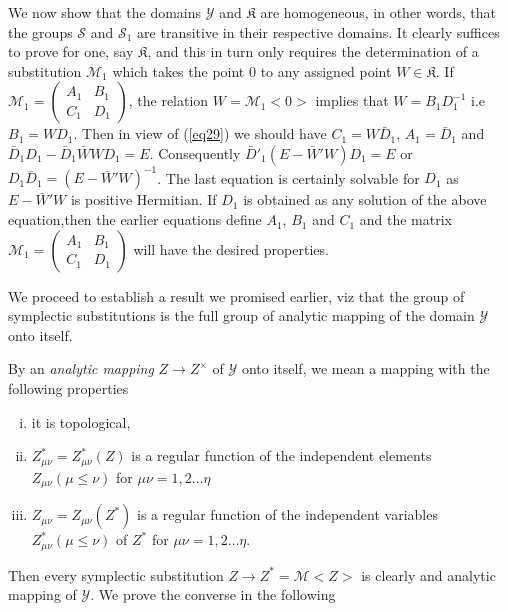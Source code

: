  We now show that the domains $\mathscr{Y}$ and $\mathfrak{K}$ are
 homogeneous, in other words, that the groups $\mathcal{S}$ and
 $\mathcal{S}_1$ are transitive in their respective domains. It
 clearly suffices to prove for one, say $\mathfrak{K}$, and this in
 turn only requires the determination of a substitution  $\mathcal{M}_1$ which
 takes the point 0 to any assigned point $W \in
 \mathfrak{K}$. If $\mathcal{M}_1 = \begin{pmatrix}  A_1 & B_1 \\ C_1 &
   D_1\end{pmatrix}$, the relation $W = \mathcal{M}_1 < 0 >$ implies that $W =
   B_1 D_1^{-1}$ i.e $B_1 = W D_1$. Then in view of (\ref{eq29}) we should have
   $C_1 = W \bar{D}_1$, $ A_1 = \bar{D}_1$ and $\bar{D}_1 D_1 - \bar{D}_1
   \bar{W} W D_1 = E$. Consequently $\bar{D}'_1 (E - \bar{W}'W) D_1 =
   E$ or $D_1 \bar{D}_1 = (E - \bar{W}' W)^{-1}$. The last
   equation is certainly solvable for $D_1$ as $E -\bar{W}'W$ is
   positive Hermitian. If $D_1$ is obtained as any solution of the
   above equation,\pageoriginale then the earlier equations define
   $A_1$, $B_1$ and    $C_1$ and the matrix $\mathcal{M}_1
   = \begin{pmatrix} A_1 & B_1\\ C_1 &      D_1\end{pmatrix}$ will
     have the desired properties.     

 We proceed to establish a result we promised earlier, viz that the
 group of symplectic substitutions is the full group of analytic
 mapping of the domain $\mathscr{Y}$ onto itself. 
 
 By an \textit{analytic mapping} $Z \to Z^\times$ of $\mathscr{Y}$
 onto itself, we mean a mapping with the following properties  
 \begin{enumerate} [i)] 
\item it is topological, 

\item $Z^\ast_{\mu \nu} = Z^\ast_{\mu \nu} (Z)$ is a regular
  function of the independent elements $Z_{\mu \nu} (\mu \le \nu)$
 for $\mu \nu = 1,2 \dots \eta$ 

\item $Z_{\mu \nu} = Z_{\mu \nu} (Z^\ast)$ is a regular
  function of the independent variables $Z^\ast_{\mu \nu} (\mu \le
  \nu)$ of $Z^\ast$ for $\mu \nu = 1,2 \dots \eta$. 
 \end{enumerate} 
 
 Then every symplectic substitution $Z \to Z^\ast = \mathcal{M} < Z > $ is
 clearly and analytic mapping of $\mathscr{Y}$. We prove the converse
 in the following  


